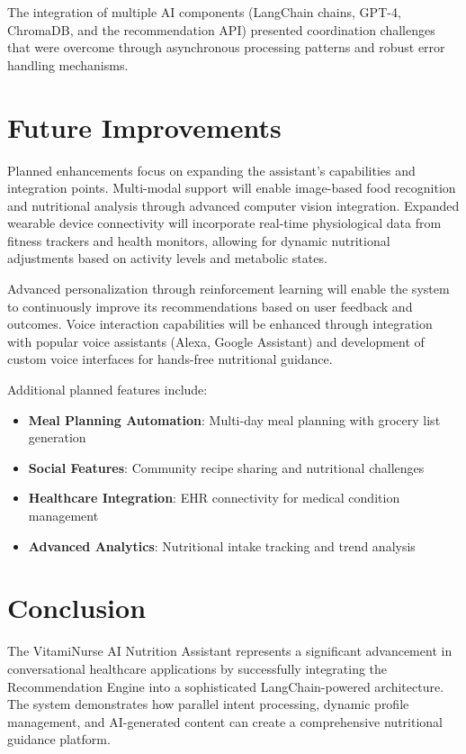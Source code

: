 The integration of multiple AI components (LangChain chains, GPT-4, ChromaDB, and the recommendation API) presented coordination challenges that were overcome through asynchronous processing patterns and robust error handling mechanisms.

\section{Future Improvements}
Planned enhancements focus on expanding the assistant's capabilities and integration points. Multi-modal support will enable image-based food recognition and nutritional analysis through advanced computer vision integration. Expanded wearable device connectivity will incorporate real-time physiological data from fitness trackers and health monitors, allowing for dynamic nutritional adjustments based on activity levels and metabolic states.

Advanced personalization through reinforcement learning will enable the system to continuously improve its recommendations based on user feedback and outcomes. Voice interaction capabilities will be enhanced through integration with popular voice assistants (Alexa, Google Assistant) and development of custom voice interfaces for hands-free nutritional guidance.

Additional planned features include:
\begin{itemize}
\item \textbf{Meal Planning Automation}: Multi-day meal planning with grocery list generation
\item \textbf{Social Features}: Community recipe sharing and nutritional challenges
\item \textbf{Healthcare Integration}: EHR connectivity for medical condition management
\item \textbf{Advanced Analytics}: Nutritional intake tracking and trend analysis
\end{itemize}


\section{Conclusion}
The VitamiNurse AI Nutrition Assistant represents a significant advancement in conversational healthcare applications by successfully integrating the Recommendation Engine into a sophisticated LangChain-powered architecture. The system demonstrates how parallel intent processing, dynamic profile management, and AI-generated content can create a comprehensive nutritional guidance platform.

